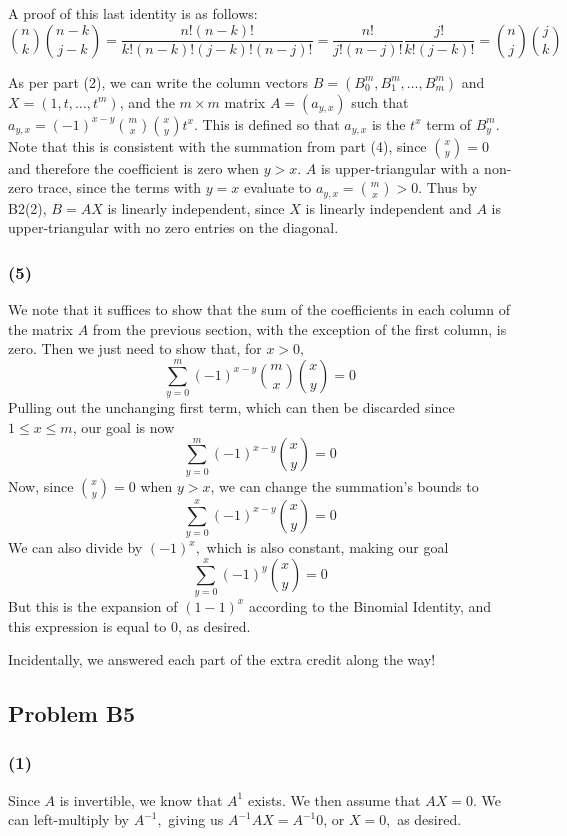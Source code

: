 \documentclass{article}
\begin{document}
A proof of this last identity is as follows:
\[\binom{n}{k}\binom{n-k}{j-k} = \frac{n!(n-k)!}{k!(n-k)!(j-k)!(n-j)!}
=\frac{n!}{j!(n-j)!}\frac{j!}{k!(j-k)!} = \binom{n}{j}\binom{j}{k}\]

\medskip
As per part (2), we can write the column vectors
$B = \displaystyle{(B_0^m, B_1^m,\dots,B_m^m)}$ and $X = (1,t,\dots,t^m)$,
and the $m\times m$ matrix
$A = (a_{y,x})$ such that $a_{y,x} = (-1)^{x - y} \binom{m}{x}\binom{x}{y}t^x$.
This is defined so that $a_{y,x}$ is the $t^x$ term of $B^m_y$.
Note that this is consistent with the summation from part (4), since 
$\binom{x}{y} = 0$ and therefore the coefficient is zero when $y > x$. 
$A$ is upper-triangular with a non-zero trace, since the terms with $y=x$
evaluate to $a_{y,x} = \binom{m}{x} > 0$.
Thus by B2(2), $B = AX$ is linearly independent, since $X$ is linearly
independent and $A$ is upper-triangular with no zero entries on the diagonal.

\subsubsection{(5)}
We note that it suffices to show that the sum of the coefficients in each column
of the matrix $A$ from the previous section, with the exception of the first
column, is zero.
Then we just need to show that, for $x > 0,$
\[\sum_{y=0}^m (-1)^{x-y} \binom{m}{x}\binom{x}{y} = 0\]
Pulling out the unchanging first term, which can then be discarded since
$1 \leq x \leq m$, our goal is now
\[\sum_{y=0}^m (-1)^{x-y}\binom{x}{y} = 0\]
Now, since $\binom{x}{y} = 0$ when $y > x$, we can change the summation's bounds
to
\[\sum_{y=0}^x (-1)^{x-y}\binom{x}{y} = 0\]
We can also divide by $(-1)^x,$ which is also constant, making our goal
\[\sum_{y=0}^x(-1)^y \binom{x}{y} = 0\]
But this is the expansion of $(1 - 1)^x$ according to the Binomial Identity,
and this expression is equal to $0$, as desired.

\medskip
Incidentally, we answered each part of the extra credit along the way!

\subsection{Problem B5}
\subsubsection{(1)}
Since $A$ is invertible, we know that $A^{1}$ exists.
We then assume that $AX = 0.$ We can left-multiply by $A^{-1},$ giving us
$A^{-1}AX =  A^{-1}0$, or $X = 0,$ as desired.
\end{document}
